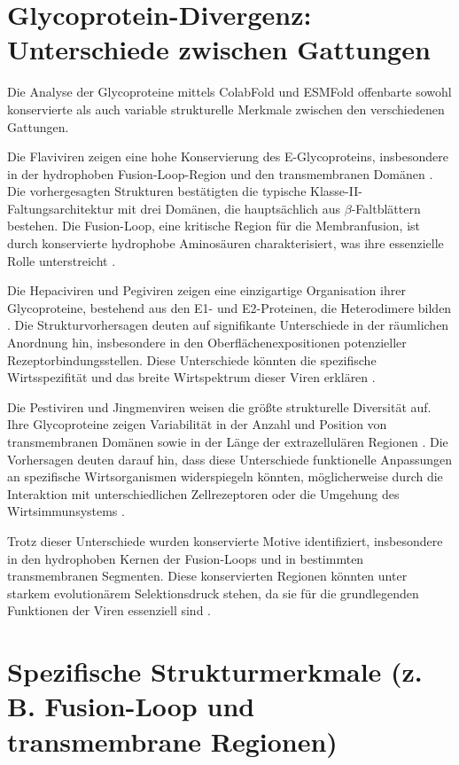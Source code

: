 \section{Glycoprotein-Divergenz: Unterschiede zwischen Gattungen} \label{sec:glycoprotein-divergenz}

Die Analyse der Glycoproteine mittels ColabFold und ESMFold offenbarte sowohl konservierte als auch variable strukturelle Merkmale zwischen den verschiedenen Gattungen.

Die Flaviviren zeigen eine hohe Konservierung des E-Glycoproteins, insbesondere in der hydrophoben Fusion-Loop-Region und den transmembranen Domänen \autocite{Rey1995}. Die vorhergesagten Strukturen bestätigten die typische Klasse-II-Faltungsarchitektur mit drei Domänen, die hauptsächlich aus $\beta$-Faltblättern bestehen. Die Fusion-Loop, eine kritische Region für die Membranfusion, ist durch konservierte hydrophobe Aminosäuren charakterisiert, was ihre essenzielle Rolle unterstreicht \autocite{Modis2004}.

Die Hepaciviren und Pegiviren zeigen eine einzigartige Organisation ihrer Glycoproteine, bestehend aus den E1- und E2-Proteinen, die Heterodimere bilden \autocite{Vieyres2013}. Die Strukturvorhersagen deuten auf signifikante Unterschiede in der räumlichen Anordnung hin, insbesondere in den Oberflächenexpositionen potenzieller Rezeptorbindungsstellen. Diese Unterschiede könnten die spezifische Wirtsspezifität und das breite Wirtspektrum dieser Viren erklären \autocite{Lavie2017}.

Die Pestiviren und Jingmenviren weisen die größte strukturelle Diversität auf. Ihre Glycoproteine zeigen Variabilität in der Anzahl und Position von transmembranen Domänen sowie in der Länge der extrazellulären Regionen \autocite{Tautz2015}. Die Vorhersagen deuten darauf hin, dass diese Unterschiede funktionelle Anpassungen an spezifische Wirtsorganismen widerspiegeln könnten, möglicherweise durch die Interaktion mit unterschiedlichen Zellrezeptoren oder die Umgehung des Wirtsimmunsystems \autocite{georgelVirusHostInteractions2010}.

Trotz dieser Unterschiede wurden konservierte Motive identifiziert, insbesondere in den hydrophoben Kernen der Fusion-Loops und in bestimmten transmembranen Segmenten. Diese konservierten Regionen könnten unter starkem evolutionärem Selektionsdruck stehen, da sie für die grundlegenden Funktionen der Viren essenziell sind \autocite{Modis2004}.

\section{Spezifische Strukturmerkmale (z. B. Fusion-Loop und transmembrane Regionen)} \label{sec:spezifische-strukturmerkmale}

